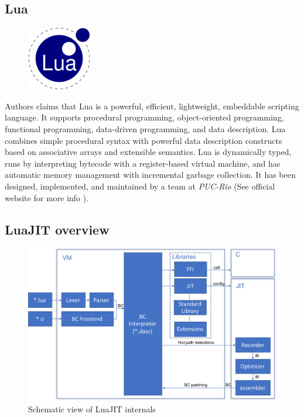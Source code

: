 


\subsection{Lua}
\label{Subsec:Lua}

\begin{figure}
    \centering
	\includegraphics[width=0.25\textwidth]{./Images/Lua.eps}
    \label{fig:lua-logo}
\end{figure}

Authors claims that Lua is a powerful, efficient, lightweight, embeddable
scripting language. It supports procedural programming, object-oriented
programming, functional programming, data-driven programming, and data
description. Lua combines simple procedural syntax with powerful data description
constructs based on associative arrays and extensible semantics. Lua is
dynamically typed, runs by interpreting bytecode with a register-based virtual
machine, and has automatic memory management with incremental garbage collection.
It has been designed, implemented, and maintained by a team at \emph{PUC-Rio}
(See official website for more info \cite{lua}).


%

\subsection{LuaJIT overview}
\label{Subsec:LuaJIT-overview}

\begin{figure}[H]
    \centering
	\includegraphics[width=\textwidth]{./Images/LuaJIT.pdf}
    \caption{Schematic view of LuaJIT internals}
    \label{fig:mad-graph}
\end{figure}
